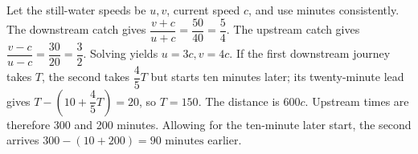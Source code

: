 Let the still-water speeds be $u,v$, current speed $c$, and use minutes consistently. The downstream catch gives $\dfrac{v+c}{u+c}=\dfrac{50}{40}=\dfrac{5}{4}$. The upstream catch gives $\dfrac{v-c}{u-c}=\dfrac{30}{20}=\dfrac{3}{2}$. Solving yields $u=3c,v=4c$. If the first downstream journey takes $T$, the second takes $\dfrac{4}{5}T$ but starts ten minutes later; its twenty-minute lead gives $T-(10+\dfrac{4}{5}T)=20$, so $T=150$. The distance is $600c$. Upstream times are therefore 300 and 200 minutes. Allowing for the ten-minute later start, the second arrives $300-(10+200)=\boxed{90\text{ minutes}}$ earlier.
